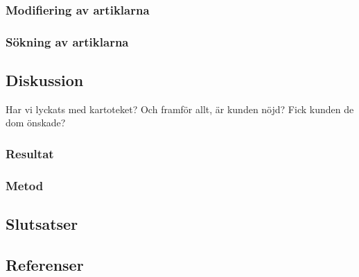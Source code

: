 \clearpage
\subsubsection{Modifiering av artiklarna}


\subsubsection{Sökning av artiklarna}



\subsection{Diskussion}
Har vi lyckats med kartoteket? Och framför allt, är
kunden nöjd? Fick kunden de dom önskade?

\subsubsection{Resultat}


\subsubsection{Metod}


\subsection{Slutsatser}


\subsection{Referenser}
\vspace{-9mm}
\renewcommand{\refname}{}
\begin{thebibliography}{9}

\end{thebibliography}
